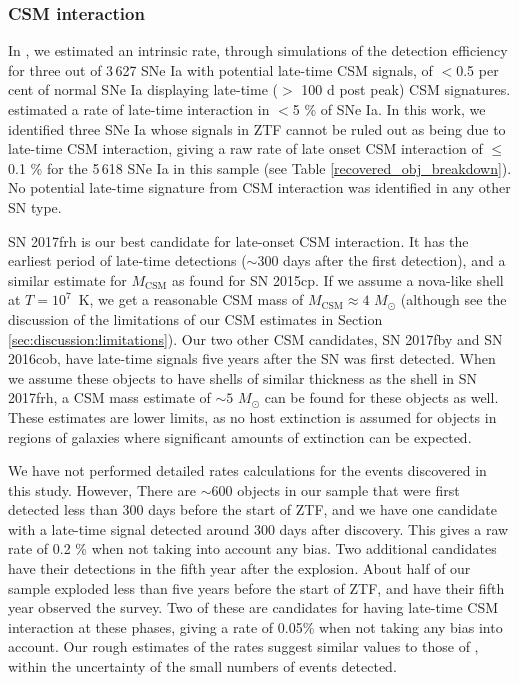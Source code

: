 \documentclass[a4paper,oneside,12pt, class=Latex/Classes/PhDthesisPSnPDF, crop=false]{standalone}
\begin{document}
\subsubsection{CSM interaction}
In \citet{Terwel_2024_paper1}, we estimated an intrinsic rate, through simulations of the detection efficiency for three out of 3\,627 SNe Ia with potential late-time CSM signals, of $<$0.5 per cent of normal SNe Ia displaying late-time ($>$ 100 d post peak) CSM signatures. \cite{GALEX_Late_CSM} estimated a rate of late-time interaction in $<$5 \% of SNe Ia. In this work, we identified three SNe Ia whose signals in ZTF cannot be ruled out as being due to late-time CSM interaction, giving a raw rate of late onset CSM interaction of $\leq$0.1 \% for the 5\,618 SNe Ia in this sample (see Table \ref{recovered_obj_breakdown}). No potential late-time signature from CSM interaction was identified in any other SN type.

SN 2017frh is our best candidate for late-onset CSM interaction. It has the earliest period of late-time detections ($\sim 300$ days after the first detection), and a similar estimate for $M_\text{CSM}$ as \citet{2015cp} found for SN 2015cp. If we assume a nova-like shell at $T=10^7$~K, we get a reasonable CSM mass of $M_\text{CSM} \approx 4$ $M_\odot$ (although see the discussion of the limitations of our CSM estimates in Section \ref{sec:discussion:limitations}). Our two other CSM candidates, SN 2017fby and SN 2016cob, have late-time signals five years after the SN was first detected. When we assume these objects to have shells of similar thickness as the shell in SN 2017frh, a CSM mass estimate of $\sim 5$ $M_\odot$ can be found for these objects as well. These estimates are lower limits, as no host extinction is assumed for objects in regions of galaxies where significant amounts of extinction can be expected.

We have not performed detailed rates calculations for the events discovered in this study. However, There are $\sim600$ objects in our sample that were first detected less than 300 days before the start of ZTF, and we have one candidate with a late-time signal detected around 300 days after discovery. This gives a raw rate of 0.2 \% when not taking into account any bias. Two additional candidates have their detections in the fifth year after the explosion. About half of our sample exploded less than five years before the start of ZTF, and have their fifth year observed the survey. Two of these are candidates for having late-time CSM interaction at these phases, giving a rate of 0.05\% when not taking any bias into account. Our rough estimates of the rates suggest similar values to those of \citet{Terwel_2024_paper1}, within the uncertainty of the small numbers of events detected.
\end{document}
